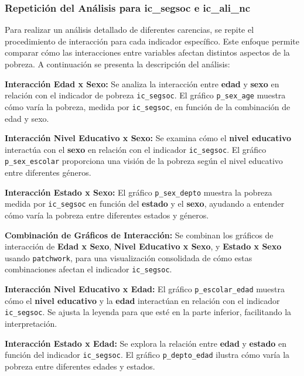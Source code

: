\documentclass[
  12pt,
]{book}
\begin{document}
\hypertarget{repeticiuxf3n-del-anuxe1lisis-para-ic_segsoc-e-ic_ali_nc}{%
\subsubsection*{Repetición del Análisis para ic\_segsoc e ic\_ali\_nc}\label{repeticiuxf3n-del-anuxe1lisis-para-ic_segsoc-e-ic_ali_nc}}

Para realizar un análisis detallado de diferentes carencias, se repite el procedimiento de interacción para cada indicador específico. Este enfoque permite comparar cómo las interacciones entre variables afectan distintos aspectos de la pobreza. A continuación se presenta la descripción del análisis:

\textbf{Interacción Edad x Sexo:}
Se analiza la interacción entre \textbf{edad} y \textbf{sexo} en relación con el indicador de pobreza \texttt{ic\_segsoc}. El gráfico \texttt{p\_sex\_age} muestra cómo varía la pobreza, medida por \texttt{ic\_segsoc}, en función de la combinación de edad y sexo.

\textbf{Interacción Nivel Educativo x Sexo:}
Se examina cómo el \textbf{nivel educativo} interactúa con el \textbf{sexo} en relación con el indicador \texttt{ic\_segsoc}. El gráfico \texttt{p\_sex\_escolar} proporciona una visión de la pobreza según el nivel educativo entre diferentes géneros.

\textbf{Interacción Estado x Sexo:}
El gráfico \texttt{p\_sex\_depto} muestra la pobreza medida por \texttt{ic\_segsoc} en función del \textbf{estado} y el \textbf{sexo}, ayudando a entender cómo varía la pobreza entre diferentes estados y géneros.

\textbf{Combinación de Gráficos de Interacción:}
Se combinan los gráficos de interacción de \textbf{Edad x Sexo}, \textbf{Nivel Educativo x Sexo}, y \textbf{Estado x Sexo} usando \texttt{patchwork}, para una visualización consolidada de cómo estas combinaciones afectan el indicador \texttt{ic\_segsoc}.

\textbf{Interacción Nivel Educativo x Edad:}
El gráfico \texttt{p\_escolar\_edad} muestra cómo el \textbf{nivel educativo} y la \textbf{edad} interactúan en relación con el indicador \texttt{ic\_segsoc}. Se ajusta la leyenda para que esté en la parte inferior, facilitando la interpretación.

\textbf{Interacción Estado x Edad:}
Se explora la relación entre \textbf{edad} y \textbf{estado} en función del indicador \texttt{ic\_segsoc}. El gráfico \texttt{p\_depto\_edad} ilustra cómo varía la pobreza entre diferentes edades y estados.
\end{document}
